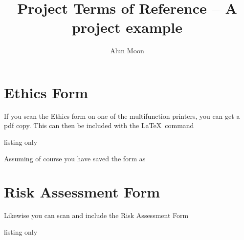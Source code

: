 \documentclass[12pt]{article}
\title{Project Terms of Reference -- A project example}
\author{Alun Moon}
\begin{document}
\maketitle




\appendix

\section{Ethics Form}
If you scan the Ethics form on one of the multifunction printers, you can get a pdf copy.  This can then be included with the \LaTeX\ command
\begin{tcblisting}{listing only}

\end{tcblisting}
Assuming of course you have saved the form  as 


\section{Risk Assessment Form}
Likewise you can scan and include the Risk Assessment Form
\begin{tcblisting}{listing only}

\end{tcblisting}
\end{document}
